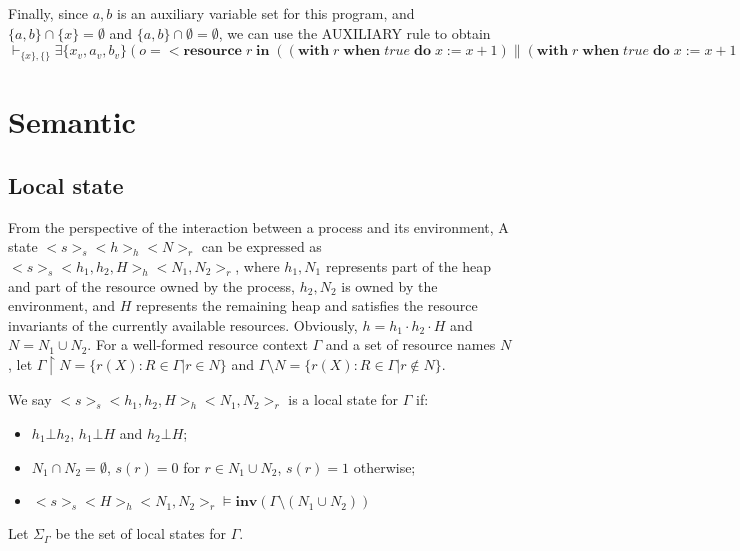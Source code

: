 \documentclass{lmcs} %
\theoremstyle{plain}\newtheorem{satz}[thm]{Satz} %
\begin{document}
\begin{enumerate}
  Finally, since $a,b$ is an auxiliary variable set for this program, and $\{a,b\}\cap \{x\}=\emptyset$ and $\{a,b\}\cap \emptyset=\emptyset$,  we can use the AUXILIARY rule to obtain\\
  $\vdash_{\{x\},\{\}}\exists \{x_v,a_v,b_v\}(o=<\!\!\mathbf{resource}\;r\;\mathbf{in}\;((\mathbf{with}\;r\;\mathbf{when}\;true\;\mathbf{do}\;x:=x+1)\parallel(\mathbf{with}\;r\;\mathbf{when}\; true\;\mathbf{do}\;x:=x+1))\!\!>_k<\!\!x\mapsto x_v\!\!>_s<\!\!\cdot\!\!>_h<\!\!\cdot\!\!>_r\land x=0\land\mathbf{emp})\Downarrow\exists \{x_v,a_v,b_v\}(o=<\!\!\cdot\!\!>_k<\!\!x\mapsto x_v+2\!\!>_s<\!\!\cdot\!\!>_h<\!\!\cdot\!\!>_r\land x=2\land\mathbf{emp})$
\end{enumerate}
\section{Semantic}
\subsection*{Local state}
From the perspective of the interaction between a process and its environment, A state $<\!\!s\!\!>_s<\!\!h\!\!>_h<\!\!N\!\!>_r$
can be expressed as $<\!\!s\!\!>_s<\!\!h_1,h_2,H\!\!>_h<\!\!N_1,N_2\!\!>_r$, where $h_1,N_1$ represents part of the heap and part of the resource owned by the process, $h_2,N_2$ is owned by the environment, and $H$ represents the remaining heap and satisfies the resource invariants of the currently available resources. Obviously, $h=h_1\cdot h_2 \cdot H$ and $N=N_1\cup N_2$.
For a well-formed resource context $\Gamma$ and a set of resource names $N$, let $\Gamma\upharpoonright N=\{ r(X):R \in \Gamma | r \in N \}$ and $\Gamma \setminus N=\{ r(X):R \in \Gamma | r \notin N \}$.
\begin{defi}
We say $<\!\!s\!\!>_s<\!\!h_1,h_2,H\!\!>_h<\!\!N_1,N_2\!\!>_r$ is a local state for $\Gamma$ if:
\begin{itemize}
  \item $h_1\bot h_2$, $h_1\bot H$ and $h_2\bot H$;
  \item $N_1 \cap N_2=\emptyset$, $s(r)=0 $ for $r\in N_1\cup N_2$, $s(r)=1 $ otherwise;
  \item $<\!\!s\!\!>_s<\!\!H\!\!>_h<\!\!N_1,N_2\!\!>_r\models \mathbf{inv}(\Gamma \setminus (N_1\cup N_2))$
\end{itemize}
\end{defi}
Let $\Sigma_\Gamma$ be the set of local states for $\Gamma$.
\end{document}

